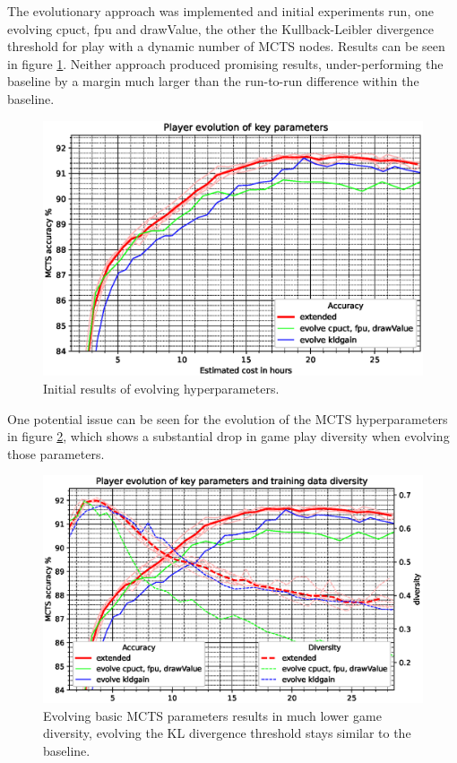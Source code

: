 \documentclass[12pt,onecolumn,oneside,titlepage]{article}
\begin{document}
The evolutionary approach was implemented and initial experiments run, one evolving cpuct, fpu and drawValue, the other the Kullback-Leibler divergence threshold for play with a dynamic number of MCTS nodes.
Results can be seen in figure \ref{fig:evolve_results}. Neither approach produced promising results, under-performing the baseline by a margin much larger than the run-to-run difference within the baseline.

\begin{figure}[H]
\centering
\includegraphics[clip,width=\columnwidth]{evolve_results}
\caption{Initial results of evolving hyperparameters.}
\label{fig:evolve_results}
\end{figure}

One potential issue can be seen for the evolution of the MCTS hyperparameters in figure \ref{fig:evolve_low_diversity}, which shows a substantial drop in game play diversity when evolving those parameters.

\begin{figure}[H]
\centering
\includegraphics[clip,width=\columnwidth]{evolve_low_diversity}
\caption{Evolving basic MCTS parameters results in much lower game diversity, evolving the KL divergence threshold stays similar to the baseline. }
\label{fig:evolve_low_diversity}
\end{figure}
\end{document}
